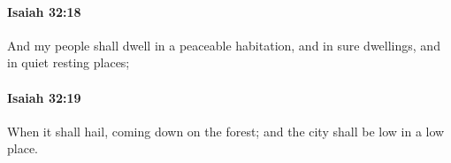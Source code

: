 		\paragraph{Isaiah 32:18} %
			\label{ISAIAH-32-18}

			And my people shall dwell in a peaceable habitation, and in sure dwellings, and in quiet resting places;


		\paragraph{Isaiah 32:19} %
			\label{ISAIAH-32-19}

			When it shall hail, coming down on the forest; and the city shall be low in a low place.


